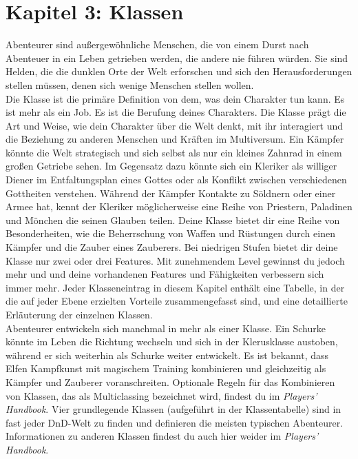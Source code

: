 \section{Kapitel 3:  Klassen}
Abenteurer sind außergewöhnliche Menschen, die von einem Durst nach Abenteuer in ein Leben getrieben werden, die andere nie führen würden. Sie sind Helden, die die dunklen Orte der Welt erforschen und sich den Herausforderungen stellen müssen, denen sich wenige Menschen stellen wollen.\\
Die Klasse ist die primäre Definition von dem, was dein Charakter tun kann. Es ist mehr als ein Job. Es ist die Berufung deines Charakters. Die Klasse prägt die Art und Weise, wie dein Charakter über die Welt denkt, mit ihr interagiert und die Beziehung zu anderen Menschen und Kräften im Multiversum. Ein Kämpfer könnte die Welt strategisch und sich selbst als nur ein kleines Zahnrad in einem großen Getriebe sehen. Im Gegensatz dazu könnte sich ein Kleriker als williger Diener im Entfaltungsplan eines Gottes oder als Konflikt zwischen verschiedenen Gottheiten verstehen. Während der Kämpfer Kontakte zu Söldnern oder einer Armee hat, kennt der Kleriker möglicherweise eine Reihe von Priestern, Paladinen und Mönchen die seinen Glauben teilen. Deine Klasse bietet dir eine Reihe von Besonderheiten, wie die Beherrschung von Waffen und Rüstungen durch einen Kämpfer und die Zauber eines Zauberers. Bei niedrigen Stufen bietet dir deine Klasse nur zwei oder drei Features. Mit zunehmendem Level gewinnst du jedoch mehr und und deine vorhandenen Features und Fähigkeiten verbessern sich immer mehr. Jeder Klasseneintrag in diesem Kapitel enthält eine Tabelle, in der die auf jeder Ebene erzielten Vorteile zusammengefasst sind, und eine detaillierte Erläuterung der einzelnen Klassen. \\
Abenteurer entwickeln sich manchmal in mehr als einer Klasse. Ein Schurke könnte im Leben die Richtung wechseln und sich in der Klerusklasse austoben, während er sich weiterhin als Schurke weiter entwickelt. Es ist bekannt, dass Elfen Kampfkunst mit magischem Training kombinieren und gleichzeitig als Kämpfer und Zauberer voranschreiten. Optionale Regeln für das Kombinieren von Klassen, das als Multiclassing bezeichnet wird, findest du im \textit{Players' Handbook}.
Vier grundlegende Klassen (aufgeführt in der Klassentabelle) sind in fast jeder DnD-Welt zu finden und definieren die meisten typischen Abenteurer. Informationen zu anderen Klassen findest du auch hier weider im \textit{Players' Handbook}.


